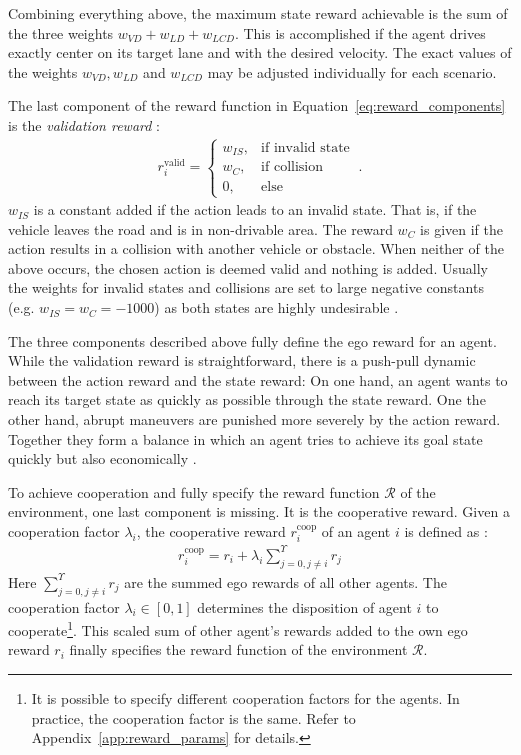 Combining everything above, the maximum state reward achievable is the sum of the three weights $w_{VD} + w_{LD} + w_{LCD}$. This is accomplished if the agent drives exactly center on its target lane and with the desired velocity. The exact values of the weights $w_{VD}, w_{LD}$ and $w_{LCD}$ may be adjusted individually for each scenario.

The last component of the reward function in Equation~\ref{eq:reward_components} is the \emph{validation reward} \cite{kurzerDecentralizedCooperativePlanning2018}:
\begin{align}
    r_i^{\text{valid}} = \begin{cases} w_{IS}, & \text{if invalid state} \\ w_{C}, & \text{if collision} \\ 0, & \text{else} \end{cases}~.
\end{align}
$w_{IS}$ is a constant added if the action leads to an invalid state. That is, if the vehicle leaves the road and is in non-drivable area. The reward $w_{C}$ is given if the action results in a collision with another vehicle or obstacle. When neither of the above occurs, the chosen action is deemed valid and nothing is added. Usually the weights for invalid states and collisions are set to large negative constants (e.g. $w_{IS} = w_{C} = -1000$) as both states are highly undesirable \cite{kurzerDecentralizedCooperativePlanning2018}.

The three components described above fully define the ego reward for an agent. While the validation reward is straightforward, there is a push-pull dynamic between the action reward and the state reward: On one hand, an agent wants to reach its target state as quickly as possible through the state reward. One the other hand, abrupt maneuvers are punished more severely by the action reward. Together they form a balance in which an agent tries to achieve its goal state quickly but also economically \cite{kurzerDecentralizedCooperativePlanning2018}.

To achieve cooperation and fully specify the reward function $\mathcal R$ of the environment, one last component is missing. It is the cooperative reward. Given a cooperation factor $\lambda_i$, the cooperative reward $r^{\text{coop}}_i$ of an agent $i$ is defined as \cite{kurzerDecentralizedCooperativePlanning2018}:
\begin{gather}\label{eq:coop_reward}
    r^{\text{coop}}_i = r_i + \lambda_i \sum_{j=0, j \neq i}^{\Upsilon} r_j
\end{gather}
Here $\sum_{j=0, j \neq i}^{\Upsilon} r_j$ are the summed ego rewards of all other agents. The cooperation factor $\lambda_i \in [0, 1]$ determines the disposition of agent $i$ to cooperate\footnote{It is possible to specify different cooperation factors for the agents. In practice, the cooperation factor is the same. Refer to Appendix~\ref{app:reward_params} for details.}. This scaled sum of other agent's rewards added to the own ego reward $r_i$ finally specifies the reward function of the environment $\mathcal R$.

